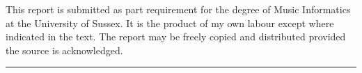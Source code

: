 \pagestyle{empty}
\noindent
This report is submitted as part requirement for the degree of Music Informatics
at the University of Sussex. It is the product of my own labour except where
indicated in the text. The report may be freely copied and distributed
provided the source is acknowledged.\\[1cm]

\noindent
\rule{\linewidth}{0.2mm}
